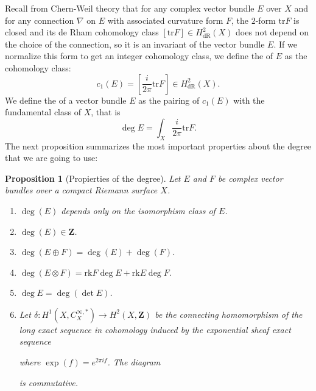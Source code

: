 \documentclass[12pt,a4paper]{book}
\newtheorem{prop}[thm]{Proposition}
\theoremstyle{definition} \newtheorem{defn}[thm]{Definition}
\theoremstyle{definition} \newtheorem{ejemplo}[thm]{Example}
\theoremstyle{remark} \newtheorem{rem}[thm]{Remark}
\def\ZZ{\mathbf{Z}}
\def\tr{\mathrm{tr}}
\def\rk{\mathrm{rk}}
\let\emph\relax
\begin{document}
Recall from Chern-Weil theory \cite{griffithsharris,wells} that for any complex vector bundle $E$ over $X$ and for any connection $\nabla$ on $E$ with associated curvature form $F$, the $2$-form $\tr F$ is closed and its de Rham cohomology class $[\tr F]\in H_{\mathrm{dR}}^2(X)$ does not depend on the choice of the connection, so it is an invariant of the vector bundle $E$. If we normalize this form to get an integer cohomology class, we define the \emph{first Chern class} of $E$ as the cohomology class:
\begin{equation*}
  c_1(E)=\left[ \frac{i}{2\pi} \tr F \right] \in H_{\mathrm{dR}}^2(X).
\end{equation*}
We define the \emph{degree} of a vector bundle $E$ as the pairing of $c_1(E)$ with the fundamental class of $X$, that is
\begin{equation*}
  \deg E = \int_X\frac{i}{2\pi} \tr F. 
\end{equation*}
The next proposition \cite{wells} summarizes the most important properties about the degree that we are going to use:
\begin{prop}[Propierties of the degree]
  Let $E$ and $F$ be complex vector bundles over a compact Riemann surface $X$.
  \begin{enumerate}
    \item $\deg(E)$ depends only on the isomorphism class of $E$.
    \item $\deg(E) \in \mathbf{Z}$.
    \item $\deg(E\oplus F)=\deg(E)+ \deg(F)$.
    \item $\deg(E\otimes F)=\rk F \deg E + \rk E \deg F.$
    \item $\deg E=\deg(\det E) $.
    \item
      Let $\delta:H^1(X,C^{\infty,*}_X) \rightarrow H^2(X,\ZZ)$ be the connecting homomorphism of the long exact sequence in cohomology induced by the exponential sheaf exact sequence
      \begin{center}
       \end{center}
       where $\exp(f)=e^{2\pi if}$.
      The diagram
      \begin{center}
       \end{center}
       is commutative.
  \end{enumerate}
\end{prop}
\end{document}
